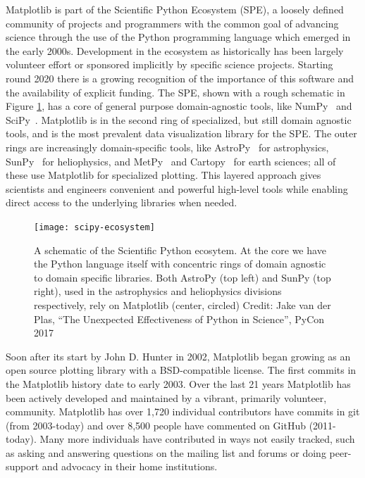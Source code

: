 \documentclass[12pt]{article}
\numberwithin{page}{section}
\begin{document}
Matplotlib is part of the Scientific Python Ecosystem (SPE), a loosely defined
community of projects and programmers with the common goal of advancing science
through the use of the Python programming language which emerged in the early
2000s.  Development in the ecosystem as historically has been largely volunteer
effort or sponsored implicitly by specific science projects.  Starting round
2020 there is a growing recognition of the importance of this software and the
availability of explicit funding.  The SPE, shown with a rough schematic in
Figure \ref{fig:ecosystem}, has a core of general purpose domain-agnostic
tools, like NumPy~\cite{Harris2020} and SciPy~\cite{Virtanen2020}.  Matplotlib
is in the second ring of specialized, but still domain agnostic tools, and is
the most prevalent data visualization library for the SPE.  The outer rings are
increasingly domain-specific tools, like AstroPy~\cite{astropy:2013,
  astropy:2018} for astrophysics, SunPy~\cite{sunpy_community2020} for
heliophysics, and MetPy~\cite{metpy} and Cartopy~\cite{Cartopy} for earth
sciences; all of these use Matplotlib for specialized plotting.
This layered approach gives scientists and engineers
convenient and powerful high-level tools while enabling direct access to the
underlying libraries when needed.


\begin{figure}
  \texttt{[image: scipy-ecosystem]}
  \caption{\small A schematic of the Scientific Python ecosytem.  At the
    core we have the Python language itself with concentric rings of
    domain agnostic to domain specific libraries.  Both AstroPy (top
    left) and SunPy (top right), used in the astrophysics and
    heliophysics divisions respectively, rely on Matplotlib (center, circled)
    Credit: Jake van der Plas, ``The Unexpected Effectiveness of Python
    in Science'', PyCon 2017}
  \label{fig:ecosystem}
\end{figure}


Soon after its start by John D. Hunter in 2002, Matplotlib began growing as an
open source plotting library with a BSD-compatible license. The first commits
in the Matplotlib history date to early 2003.  Over the last 21 years
Matplotlib has been actively developed and maintained by a vibrant, primarily
volunteer, community.  Matplotlib has over 1,720 individual contributors have
commits in git (from 2003-today) and over 8,500 people have commented on GitHub
(2011-today).  Many more individuals have contributed in ways not easily
tracked, such as asking and answering questions on the mailing list and forums
or doing peer-support and advocacy in their home institutions.
\end{document}
